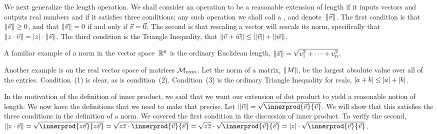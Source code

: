 We next generalize the length operation.
We shall consider an operation to be a reasonable extension of length
if it inputs vectors and outputs real numbers and if it satisfies
three conditions; any such operation
we shall call a , and denote~$\lVert\vec{v}\rVert$. 
The first condition is that $\lVert\vec{v}\rVert\geq 0$, 
and that $\lVert\vec{v}\rVert= 0$ if and only if $\vec{v}=\vec{0}$.
The second is that rescaling a vector will rescale 
its norm, specifically that 
$\lVert z\cdot \vec{v}\rVert=\lvert z\rvert\cdot\lVert\vec{v}\rVert$.
The third condition is 
the Triangle Inequality, 
that $\lVert\vec{v}+\vec{w}\rVert\leq\lVert\vec{v}\rVert+\lVert\vec{w}\rVert$.

A familiar example of a norm in the vector space~$\mathbb{R}^n$ is the ordinary
Euclidean length, $\norm{\vec{v}}=\sqrt{\smashdp{v_1^2+\cdots+v_n^2}}$.

Another example is on the real vector space of matrices
$\mathcal{M}_{n \! \times \! m}$.
Let the norm of a matrix, $\lVert M\rVert$, be the largest absolute value 
over all of the entries.  
Condition~(1) is clear, as is condition~(2).
Condition~(3) is the ordinary Triangle Inequality for reals,
$\lvert a+b\rvert\leq\lvert a\rvert+\lvert b\rvert$.


In the motivation of the definition of inner product, we said that we 
want our extension of dot product to yield a reasonable notion of
length.
We now have the definitions that we need to make that precise.
Let 
$\norm{\vec{v}}=\sqrt{\smashdp{\innerprod{\vec{v}}{\vec{v}}}}$.
We will show that this satisfies the 
three conditions in the definition of a norm.
We covered the first condition 
in the discussion of inner product.
To verify the second, 
$\norm{z\cdot\vec{v}}
=\sqrt{\smashdp{\innerprod{z\vec{v}}{z\vec{v}}}}
=\sqrt{\smashdp{z\compconj{z}\cdot\innerprod{\vec{v}}{\vec{v}}}}
=\sqrt{z\compconj{z}}\cdot\sqrt{\smashdp{\innerprod{\vec{v}}{\vec{v}}}}
=\absval{z}\cdot\sqrt{\smashdp{\innerprod{\vec{v}}{\vec{v}}}}$.

